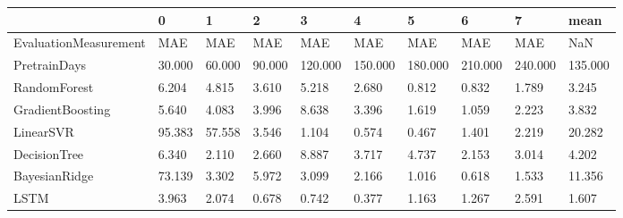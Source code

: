 \begin{tabular}{llllllllll}
\toprule
{} &      0 &      1 &      2 &       3 &       4 &       5 &       6 &       7 &    mean \\
\midrule
EvaluationMeasurement &    MAE &    MAE &    MAE &     MAE &     MAE &     MAE &     MAE &     MAE &     NaN \\
PretrainDays          & 30.000 & 60.000 & 90.000 & 120.000 & 150.000 & 180.000 & 210.000 & 240.000 & 135.000 \\
RandomForest          &  6.204 &  4.815 &  3.610 &   5.218 &   2.680 &   0.812 &   0.832 &   1.789 &   3.245 \\
GradientBoosting      &  5.640 &  4.083 &  3.996 &   8.638 &   3.396 &   1.619 &   1.059 &   2.223 &   3.832 \\
LinearSVR             & 95.383 & 57.558 &  3.546 &   1.104 &   0.574 &   0.467 &   1.401 &   2.219 &  20.282 \\
DecisionTree          &  6.340 &  2.110 &  2.660 &   8.887 &   3.717 &   4.737 &   2.153 &   3.014 &   4.202 \\
BayesianRidge         & 73.139 &  3.302 &  5.972 &   3.099 &   2.166 &   1.016 &   0.618 &   1.533 &  11.356 \\
LSTM                  &  3.963 &  2.074 &  0.678 &   0.742 &   0.377 &   1.163 &   1.267 &   2.591 &   1.607 \\
\bottomrule
\end{tabular}
